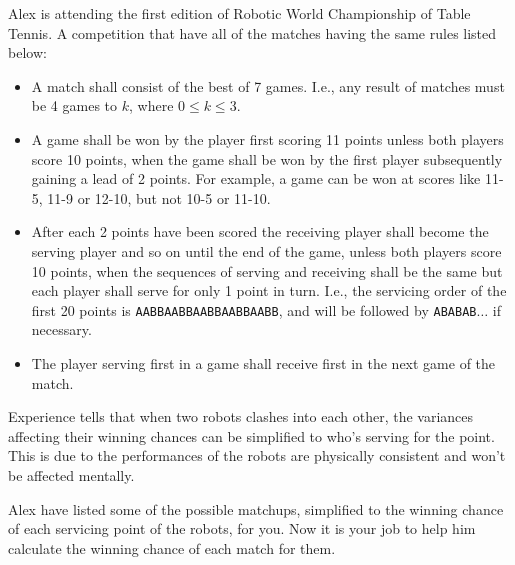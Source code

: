Alex is attending the first edition of Robotic World Championship of Table 
Tennis. 
A competition that have all of the matches having the same rules listed below:

\begin{itemize}
\tightlist
\item A match shall consist of the best of 7 games.
      I.e., any result of matches must be 4 games to $k$, 
      where $0 \leq k \leq 3$.
\item A game shall be won by the player first scoring 11 points unless both 
      players score 10 points, when the game shall be won by the first player 
      subsequently gaining a lead of 2 points.
      For example, a game can be won at scores like 11-5, 11-9 or 12-10, 
      but not 10-5 or 11-10.
\item After each 2 points have been scored the receiving player shall become 
      the serving player and so on until the end of the game, unless both 
      players score 10 points, when the sequences of serving and receiving 
      shall be the same but each player shall serve for only 1 point in turn. 
      I.e., the servicing order of the first 20 points is 
      \verb+AABBAABBAABBAABBAABB+, and will be followed by \verb+ABABAB+$\ldots$
      if necessary.
\item The player serving first in a game shall receive first in the next game 
      of the match.
\end{itemize}

Experience tells that when two robots clashes into each other, 
the variances affecting their winning chances can be simplified to 
who's serving for the point. This is due to the performances of the 
robots are physically consistent and won't be affected mentally.

Alex have listed some of the possible matchups, simplified to the winning 
chance of each servicing point of the robots, for you. Now it is your job to 
help him calculate the winning chance of each match for them.
